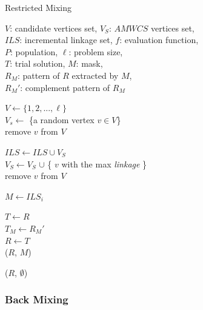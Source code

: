 \documentclass{sig-alternate-05-2015}
\begin{document}
\begin{algorithm}
\caption{Restricted Mixing}\label{algo_disjdecomp}

$V$: candidate vertices set, $V_S$: $AMWCS$ vertices set,  \\
$ILS$: incremental linkage set, $f$: evaluation function, \\
$P$: population, $\ell$: problem size, \\
$T$: trial solution, $M$: mask, \\
${R_M}$: pattern of $R$ extracted by $M$, \\
${R_M}'$: complement pattern of ${R_M}$


\BlankLine
$V \leftarrow \{ 1, 2, ..., \ell \}$ \\
$V_s \leftarrow$ \{a random vertex $v \in V$\} \\
remove $v$ from $V$ \\

 {

    $ILS \leftarrow ILS \cup V_{S}$ \\
    $V_S \leftarrow V_S$ $\cup$ \{  $v$ with the max {\it linkage} \} \\
    
    remove $v$ from $V$ \\
}

\BlankLine
{} {

    $M \leftarrow ILS_i$ \\

     {

        $T \leftarrow R$ \\
        $T_M \leftarrow {R_M}'$ \\

         {
            $R \leftarrow T$ \\
            \Return ($R$, $M$)
        }
    }
}
\Return ($R$, $\emptyset$) 
\end{algorithm}


\subsubsection{Back Mixing}
\end{document}
